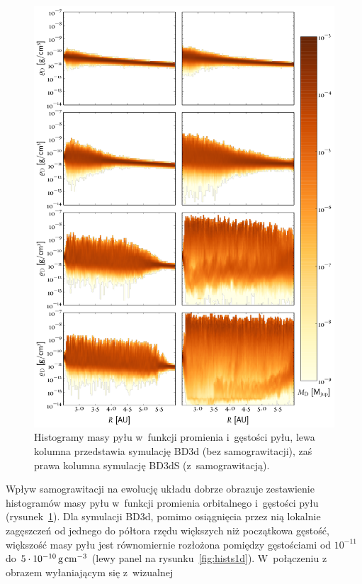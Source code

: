 \begin{figure} 
  \centering
  \includegraphics[height=0.9\textheight]{figures/hists2d}
  \caption[Histogramy masy pyłu w~funkcji promienia i~gęstości pyłu dla
  symulacji BD3d i BD3dS.]
  {Histogramy masy pyłu w~funkcji promienia i~gęstości pyłu, lewa
  kolumna przedstawia symulację BD3d (bez samograwitacji), zaś prawa kolumna
  symulację BD3dS (z~samograwitacją).}
  \label{fig:hists} 
\end{figure}
%
Wpływ samograwitacji na ewolucję układu dobrze obrazuje zestawienie histogramów
masy pyłu w~funkcji promienia orbitalnego i~gęstości pyłu
(rysunek~\ref{fig:hists}). Dla symulacji BD3d, pomimo osiągnięcia przez nią
lokalnie zagęszczeń od jednego do półtora rzędu większych niż początkowa
gęstość, większość masy pyłu jest równomiernie rozłożona pomiędzy gęstościami
od $10^{-11}$ do $5\cdot10^{-10}\hbox{$\thinspace\textrm{g}$}\hbox{$\thinspace\textrm{cm}$}^{-3}$ (lewy panel na
rysunku~\ref{fig:hists1d}). W~połączeniu z obrazem wyłaniającym się z~wizualnej
